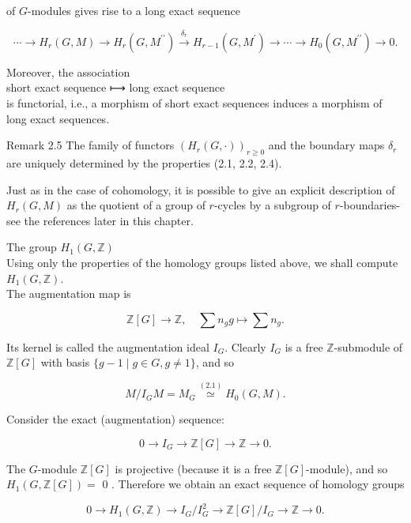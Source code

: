 \documentclass[10pt]{article}
\begin{document}
of $G$-modules gives rise to a long exact sequence

$$
\cdots \rightarrow H_{r}(G, M) \rightarrow H_{r}\left(G, M^{\prime \prime}\right) \xrightarrow{\delta_{r}} H_{r-1}\left(G, M^{\prime}\right) \rightarrow \cdots \rightarrow H_{0}\left(G, M^{\prime \prime}\right) \rightarrow 0 .
$$

Moreover, the association\\
short exact sequence ⟼ long exact sequence\\
is functorial, i.e., a morphism of short exact sequences induces a morphism of long exact sequences.

Remark 2.5 The family of functors $\left(H_{r}(G, \cdot)\right)_{r \geq 0}$ and the boundary maps $\delta_{r}$ are uniquely determined by the properties (2.1, 2.2, 2.4).

Just as in the case of cohomology, it is possible to give an explicit description of $H_{r}(G, M)$ as the quotient of a group of $r$-cycles by a subgroup of $r$-boundaries-see the references later in this chapter.

The group $H_{1}(G, \mathbb{Z})$\\
Using only the properties of the homology groups listed above, we shall compute $H_{1}(G, \mathbb{Z})$.\\
The augmentation map is

$$
\mathbb{Z}[G] \rightarrow \mathbb{Z}, \quad \sum n_{g} g \mapsto \sum n_{g} .
$$

Its kernel is called the augmentation ideal $I_{G}$. Clearly $I_{G}$ is a free $\mathbb{Z}$-submodule of $\mathbb{Z}[G]$ with basis $\{g-1 \mid g \in G, g \neq 1\}$, and so

$$
M / I_{G} M=M_{G} \stackrel{(2.1)}{\simeq} H_{0}(G, M) .
$$

Consider the exact (augmentation) sequence:


\begin{equation*}
0 \rightarrow I_{G} \rightarrow \mathbb{Z}[G] \rightarrow \mathbb{Z} \rightarrow 0 . \tag{19}
\end{equation*}


The $G$-module $\mathbb{Z}[G]$ is projective (because it is a free $\mathbb{Z}[G]$-module), and so $H_{1}(G, \mathbb{Z}[G])=$ 0 . Therefore we obtain an exact sequence of homology groups

$$
0 \rightarrow H_{1}(G, \mathbb{Z}) \rightarrow I_{G} / I_{G}^{2} \rightarrow \mathbb{Z}[G] / I_{G} \rightarrow \mathbb{Z} \rightarrow 0 .
$$
\end{document}
